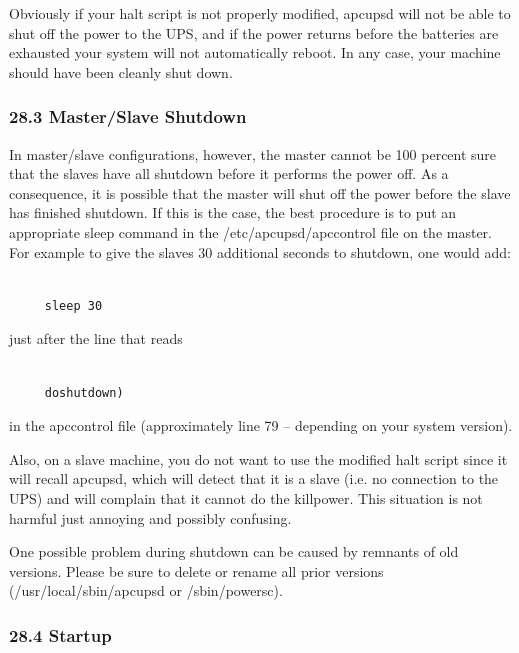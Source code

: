 {{{{{{{{{{{{{{{{{Obviously if your halt script is not properly modified, apcupsd will not be
able to shut off the power to the UPS, and if the power returns before the
batteries are exhausted your system will not automatically reboot. In any
case, your machine should have been cleanly shut down. 

\label{Master_002fSlave-Shutdown-_003c1_003e}

\subsubsection*{28.3 Master/Slave Shutdown}

In master/slave configurations, however, the master cannot be 100 percent sure
that the slaves have all shutdown before it performs the power off. As a
consequence, it is possible that the master will shut off the power before the
slave has finished shutdown. If this is the case, the best procedure is to put
an appropriate sleep command in the /etc/apcupsd/apccontrol file on the
master. For example to give the slaves 30 additional seconds to shutdown, one
would add: 

\footnotesize
\begin{verbatim}
     
     sleep 30
\end{verbatim}
\normalsize

just after the line that reads 

\footnotesize
\begin{verbatim}
     
     doshutdown)
\end{verbatim}
\normalsize

in the apccontrol file (approximately line 79 {--} depending on your system
version).  

Also, on a slave machine, you do not want to use the modified halt script
since it will recall apcupsd, which will detect that it is a slave (i.e. no
connection to the UPS) and will complain that it cannot do the killpower. This
situation is not harmful just annoying and possibly confusing.  

One possible problem during shutdown can be caused by remnants of old
versions. Please be sure to delete or rename all prior versions
(/usr/local/sbin/apcupsd or /sbin/powersc). 

\label{Startup}

\subsubsection*{28.4 Startup}

}}}}}}}}}}}}}}}}}
